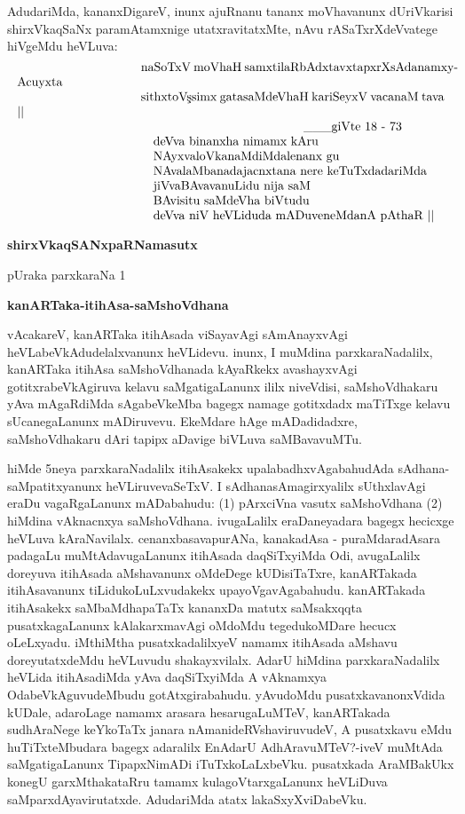 \documentclass[11pt,a4size]{article}
\begin{document}
AdudariMda, kananxDigareV, inunx ajuRnanu tananx moVhavanunx
dUriVkarisi shirxVkaqSaNx paramAtamxnige utatxravitatxMte, nAvu
rASaTxrXdeVvatege hiVgeMdu heVLuva:
$$
\vbox{\parskip=0pt\parindent=0pt \everypar{\hskip10em} \obeylines
naSoTxV moVhaH samxtilaRbAdxtavxtapxrXsAdanamxyAcuyxta
sithxtoV\char'263simx gatasaMdeVhaH kariSeyxV vacanaM tava ||

\hspace{4.5cm} \_\_\_giVte 18 - 73

\quad deVva binanxha nimamx kAru
\quad NAyxvaloVkanaMdiMdalenanx gu
\quad NAvalaMbanadajacnxtana nere keTuTxdadariMda
\quad jiVvaBAvavanuLidu nija saM
\quad BAvisitu saMdeVha biVtudu
\quad deVva niV heVLiduda mADuveneMdanA pAthaR ||}
$$

\centerline{\textbf{\Large shirxVkaqSANxpaRNamasutx}}

\newpage

\begin{center}
{\Huge pUraka parxkaraNa 1}

\smallskip
\textbf{\LARGE kanARTaka-itihAsa-saMshoVdhana}
\end{center} 

vAcakareV, kanARTaka itihAsada viSayavAgi sAmAnayxvAgi
heVLabeVkAdudelalxvanunx heVLidevu. inunx, I muMdina parxkaraNadalilx,
kanARTaka itihAsa saMshoVdhanada kAyaRkekx avashayxvAgi
gotitxrabeVkAgiruva kelavu saMgatigaLanunx ililx niveVdisi,
saMshoVdhakaru yAva mAgaRdiMda sAgabeVkeMba bagegx namage gotitxdadx
maTiTxge kelavu sUcanegaLanunx mADiruvevu. EkeMdare hAge mADadidadxre,
saMshoVdhakaru dAri tapipx aDavige biVLuva saMBavavuMTu.

hiMde 5neya parxkaraNadalilx itihAsakekx upalabadhxvAgabahudAda
sAdhana-saMpatitxyanunx heVLiruvevaSeTxV. I sAdhanasAmagirxyalilx
sUthxlavAgi eraDu vagaRgaLanunx mADabahudu: (1) pArxciVna vasutx
saMshoVdhana (2) hiMdina vAknacnxya saMshoVdhana. ivugaLalilx
eraDaneyadara bagegx hecicxge heVLuva
kAraNavilalx. cenanxbasavapurANa, kanakadAsa - puraMdaradAsara
padagaLu muMtAdavugaLanunx itihAsada daqSiTxyiMda Odi, avugaLalilx
doreyuva itihAsada aMshavanunx oMdeDege kUDisiTaTxre, kanARTakada
itihAsavanunx tiLidukoLuLxvudakekx upayoVgavAgabahudu. kanARTakada
itihAsakekx saMbaMdhapaTaTx kananxDa matutx saMsakxqqta
pusatxkagaLanunx kAlakarxmavAgi oMdoMdu tegedukoMDare hecucx
oLeLxyadu. iMthiMtha pusatxkadalilxyeV namamx itihAsada aMshavu
doreyutatxdeMdu heVLuvudu shakayxvilalx. AdarU hiMdina
parxkaraNadalilx heVLida itihAsadiMda yAva daqSiTxyiMda A vAknamxya
OdabeVkAguvudeMbudu gotAtxgirabahudu. yAvudoMdu pusatxkavanonxVdida
kUDale, adaroLage namamx arasara hesarugaLuMTeV, kanARTakada
sudhAraNege keYkoTaTx janara nAmanideRVshaviruvudeV, A pusatxkavu eMdu
huTiTxteMbudara bagegx adaralilx EnAdarU AdhAravuMTeV?-iveV muMtAda
saMgatigaLanunx TipapxNimADi iTuTxkoLaLxbeVku. pusatxkada AraMBakUkx
konegU garxMthakataRru tamamx kulagoVtarxgaLanunx heVLiDuva
saMparxdAyavirutatxde. AdudariMda atatx lakaSxyXviDabeVku.
\end{document}
